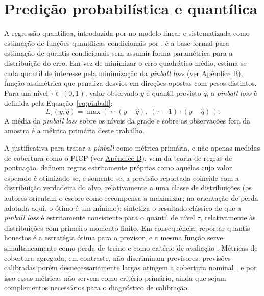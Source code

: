 \section{Predição probabilística e quantílica}
A regressão quantílica, introduzida por  no modelo linear e sistematizada como estimação de funções quantílicas condicionais por , é a base formal para estimação de quantis condicionais sem assumir forma paramétrica para a distribuição do erro. Em vez de minimizar o erro quadrático médio, estima-se cada quantil de interesse pela minimização da \textit{pinball loss} (ver \hyperref[gl:pinball]{Apêndice B}), função assimétrica que penaliza desvios em direções opostas com pesos distintos. Para um nível \(\tau \in (0,1)\), valor observado \(y\) e quantil previsto \(\hat{q}\), a \textit{pinball loss} é definida pela Equação~\ref{eq:pinball}:
\begin{equation}
    L_\tau(y, \hat{q}) = \max\left(\,\tau \cdot (y - \hat{q}),\; (\tau - 1) \cdot (y - \hat{q})\,\right).
    \label{eq:pinball}
\end{equation}
A média da \textit{pinball loss} sobre os níveis da grade e sobre as observações fora da amostra é a métrica primária deste trabalho.

A justificativa para tratar a \textit{pinball} como métrica primária, e não apenas medidas de cobertura como o PICP (ver \hyperref[gl:picp]{Apêndice B}), vem da teoria de regras de pontuação.  definem regras estritamente próprias como aquelas cujo valor esperado é otimizado se, e somente se, a previsão reportada coincide com a distribuição verdadeira do alvo, relativamente a uma classe de distribuições (os autores orientam o escore como recompensa a maximizar; na orientação de perda adotada aqui, o ótimo é um mínimo);  sintetiza o resultado clássico de que a \textit{pinball loss} é estritamente consistente para o quantil de nível \(\tau\), relativamente às distribuições com primeiro momento finito. Em consequência, reportar quantis honestos é a estratégia ótima para o previsor, e a mesma função serve simultaneamente como perda de treino e como critério de avaliação \cite{GNEITING2007}. Métricas de cobertura agregada, em contraste, não discriminam previsores: previsões calibradas porém desnecessariamente largas atingem a cobertura nominal \cite{GNEITINGBALABDAOUI2007}, e por isso essas métricas não servem como critério primário, ainda que sejam complementos necessários para o diagnóstico de calibração.


